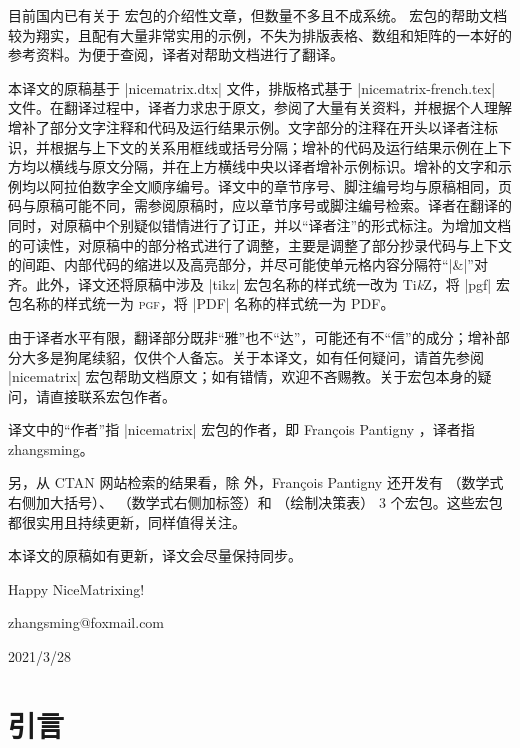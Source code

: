 \documentclass[dvipsnames]{article}%
\def\tikzname{Ti\emph{k}Z}
\def\translatedate{2021/3/28}
\begin{document}
目前国内已有关于  宏包的介绍性文章，但数量不多且不成系统。  宏包的帮助文档较为翔实，且配有大量非常实用的示例，不失为排版表格、数组和矩阵的一本好的参考资料。为便于查阅，译者对帮助文档进行了翻译。

本译文的原稿基于 |nicematrix.dtx| 文件，排版格式基于 |nicematrix-french.tex| 文件。在翻译过程中，译者力求忠于原文，参阅了大量有关资料，并根据个人理解增补了部分文字注释和代码及运行结果示例。文字部分的注释在开头以\colorbox{red!30}{译者注}标识，并根据与上下文的关系用框线或括号分隔；增补的代码及运行结果示例在上下方均以横线与原文分隔，并在上方横线中央以\colorbox{red!30}{译者增补示例}标识。增补的文字和示例均以阿拉伯数字全文顺序编号。译文中的章节序号、脚注编号均与原稿相同，页码与原稿可能不同，需参阅原稿时，应以章节序号或脚注编号检索。译者在翻译的同时，对原稿中个别疑似错情进行了订正，并以“译者注”的形式标注。为增加文档的可读性，对原稿中的部分格式进行了调整，主要是调整了部分抄录代码与上下文的间距、内部代码的缩进以及高亮部分，并尽可能使单元格内容分隔符“|&|”对齐。此外，译文还将原稿中涉及 |tikz| 宏包名称的样式统一改为 \tikzname ，将 |pgf| 宏包名称的样式统一为 \textsc{pgf}，将 |PDF| 名称的样式统一为 \textsc{PDF}。

由于译者水平有限，翻译部分既非“雅”也不“达”，可能还有不“信”的成分；增补部分大多是狗尾续貂，仅供个人备忘。关于本译文，如有任何疑问，请首先参阅 |nicematrix| 宏包帮助文档原文；如有错情，欢迎不吝赐教。关于宏包本身的疑问，请直接联系宏包作者。


译文中的“作者”指 |nicematrix| 宏包的作者，即 François Pantigny ，译者指 zhangsming。

另，从 CTAN 网站检索的结果看，除  外，François Pantigny 还开发有 （数学式右侧加大括号）、 （数学式右侧加标签）和 （绘制决策表） 3 个宏包。这些宏包都很实用且持续更新，同样值得关注。

本译文的原稿如有更新，译文会尽量保持同步。

Happy NiceMatrixing!

\vspace*{2ex}

\hfill zhangsming@foxmail.com\hspace*{5em}

\hfill \translatedate \hspace*{7em}
\clearpage

{}
\section*{引言}
\end{document}
